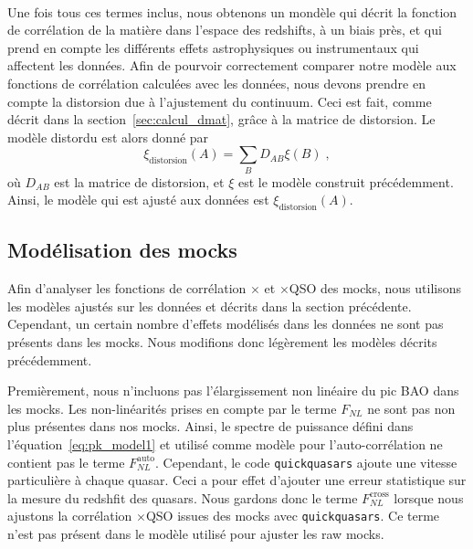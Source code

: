 \paragraph{}
Une fois tous ces termes inclus, nous obtenons un mondèle qui décrit la fonction de corrélation de la matière dans l'espace des redshifts, à un biais près, et qui prend en compte les différents effets astrophysiques ou instrumentaux qui affectent les données.
Afin de pourvoir correctement comparer notre modèle aux fonctions de corrélation calculées avec les données, nous devons prendre en compte la distorsion due à l'ajustement du continuum. Ceci est fait, comme décrit dans la section~\ref{sec:calcul_dmat}, grâce à la matrice de distorsion. Le modèle distordu est alors donné par
\begin{equation}
  \label{eq:model_dist}
  \xi_{\mathrm{distorsion}}(A) = \sum_{B}D_{AB}\xi(B) \; ,
\end{equation}
où $D_{AB}$ est la matrice de distorsion, et $\xi$ est le modèle construit précédemment.
Ainsi, le modèle qui est ajusté aux données est $\xi_{\mathrm{distorsion}}(A)$.



\subsection{Modélisation des mocks}
\label{subsec:model_mock}
Afin d'analyser les fonctions de corrélation \lya{}$\times$\lya{} et \lya{}$\times$QSO des mocks, nous utilisons les modèles ajustés sur les données et décrits dans la section précédente. Cependant, un certain nombre d'effets modélisés dans les données ne sont pas présents dans les mocks. Nous modifions donc légèrement les modèles décrits précédemment.

Premièrement, nous n'incluons pas l'élargissement non linéaire du pic BAO dans les mocks. %
Les non-linéarités prises en compte par le terme $F_{NL}$ ne sont pas non plus présentes dans nos mocks. Ainsi, le spectre de puissance défini dans l'équation~\ref{eq:pk_model1} et utilisé comme modèle pour l'auto-corrélation ne contient pas le terme $F_{NL}^{\mathrm{auto}}$. Cependant, le code \texttt{quickquasars} ajoute une vitesse particulière à chaque quasar. Ceci a pour effet d'ajouter une erreur statistique sur la mesure du redshfit des quasars. Nous gardons donc le terme $F_{NL}^{\mathrm{cross}}$ lorsque nous ajustons la corrélation \lya{}$\times$QSO issues des mocks avec \texttt{quickquasars}. Ce terme n'est pas présent dans le modèle utilisé pour ajuster les raw mocks.

